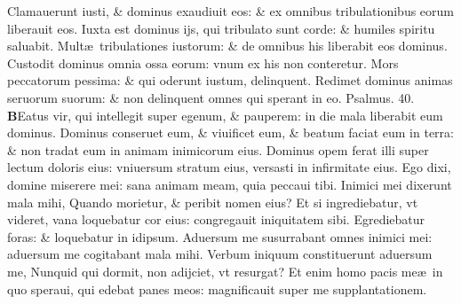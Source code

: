 \documentclass[a5paper,10pt]{book}
\def\ae{æ}
\begin{document}
\begin{multicols*}{2}
\newline \color{red} C\color{black}lamauerunt iusti, \& dominus exaudiuit eos: \& ex omnibus tribulationibus eorum liberauit eos.
\newline \color{red} I\color{black}uxta est dominus ijs, qui tribulato sunt corde: \& humiles spiritu saluabit.
\newline \color{red} M\color{black}ult\ae \ tribulationes iustorum: \& de omnibus his liberabit eos dominus.
\newline \color{red} C\color{black}ustodit dominus omnia ossa eorum: vnum ex his non conteretur.
\newline \color{red} M\color{black}ors peccatorum pessima: \& qui oderunt iustum, delinquent.
\newline \color{red} R\color{black}edimet dominus animas seruorum suorum: \& non delinquent omnes qui sperant in eo. \quad \color{red} Psalmus. \hypertarget{ps40}{40.} \color{black}
\vspace{-1em}
\lettrine[lines=2]{\bfseries \color{red} B}{}Eatus vir, qui intellegit super egenum, \& pauperem: in die mala liberabit eum dominus.%
\newline \color{red} D\color{black}ominus conseruet eum, \& viuificet eum, \& beatum faciat eum in terra: \& non tradat eum in animam inimicorum eius.
\newline \color{red} D\color{black}ominus opem ferat illi super lectum doloris eius: vniuersum stratum eius, versasti in infirmitate eius.
\newline \color{red} E\color{black}go dixi, domine miserere mei: sana animam meam, quia peccaui tibi.
\newline \color{red} I\color{black}nimici mei dixerunt mala mihi, Quando morietur, \& peribit nomen eius?
\newline \color{red} E\color{black}t si ingrediebatur, vt videret, vana loquebatur cor eius: congregauit iniquitatem sibi.
\newline \color{red} E\color{black}grediebatur foras: \& loquebatur in idipsum.
\newline \color{red} A\color{black}duersum me susurrabant omnes inimici mei: aduersum me cogitabant mala mihi.
\newline \color{red} V\color{black}erbum iniquum constituerunt aduersum me, Nunquid qui dormit, non adijciet, vt resurgat?
\newline \color{red} E\color{black}t enim homo pacis me\ae \ in quo speraui, qui edebat panes meos: magnificauit super me supplantationem.%

\end{multicols*}
\end{document}

